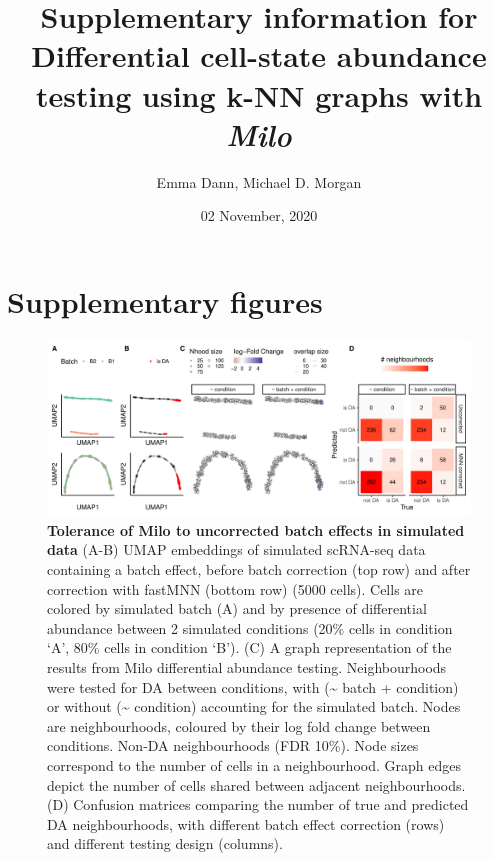 \documentclass[
]{article}
\title{Supplementary information for
\textbf{Differential cell-state abundance testing using k-NN graphs with \emph{Milo}}}
\author{Emma Dann, Michael D. Morgan}
\date{02 November, 2020}
\begin{document}
\maketitle

{
\setcounter{tocdepth}{3}
\tableofcontents
}
\renewcommand{\figurename}{Supplementary Figure}

\newpage

\hypertarget{supplementary-figures}{%
\section{Supplementary figures}\label{supplementary-figures}}

\begin{figure}
\centering
\includegraphics{suppl_figs/suppl_fig1.pdf}
\caption{\label{fig:sup-fig-1}\textbf{Tolerance of Milo to uncorrected batch effects in simulated data}
(A-B) UMAP embeddings of simulated scRNA-seq data containing a batch effect, before batch correction (top row) and after correction with fastMNN (bottom row) (5000 cells). Cells are colored by simulated batch (A) and by presence of differential abundance between 2 simulated conditions (20\% cells in condition `A', 80\% cells in condition `B').
(C) A graph representation of the results from Milo differential abundance testing. Neighbourhoods were tested for DA between conditions, with (\textasciitilde{} batch + condition) or without (\textasciitilde{} condition) accounting for the simulated batch. Nodes are neighbourhoods, coloured by their log fold change between conditions. Non-DA neighbourhoods (FDR 10\%). Node sizes correspond to the number of cells in a neighbourhood. Graph edges depict the number of cells shared between adjacent neighbourhoods.
(D) Confusion matrices comparing the number of true and predicted DA neighbourhoods, with different batch effect correction (rows) and different testing design (columns).}
\end{figure}
\end{document}
